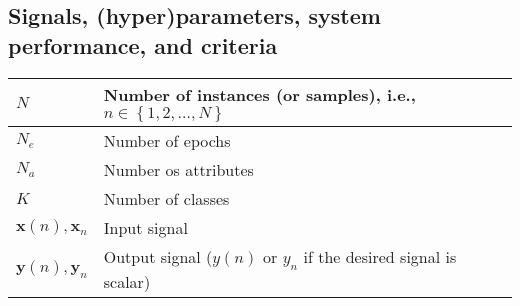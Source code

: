 \documentclass{article}
\begin{document}
\subsection{Signals, (hyper)parameters, system performance, and criteria}
\begin{xltabular}{\textwidth}{XX}
	\(N\)                                                                                                                 & Number of instances (or samples), i.e., \(n \in \left\{ 1, 2, \dots, N \right\}\)                                                                                                                                            \\ \hline
	\(N_e\)                                                                                                               & Number of epochs                                                                                                                                                                                                             \\ \hline
	\(N_a\)                                                                                                               & Number os attributes                                                                                                                                                                                                         \\ \hline
	\(K\)                                                                                                                 & Number of classes                                                                                                                                                                                                            \\ \hline
	\(\mathbf{x}(n), \mathbf{x}_n\)                                                                                       & Input signal                                                                                                                                                                                                                 \\ \hline
	\(\mathbf{y}(n), \mathbf{y}_n\)                                                                                       & Output signal (\(y(n)\) or \(y_n\) if the desired signal is scalar)                                                                                                                                                          \\ \hline

\end{xltabular}
\end{document}
